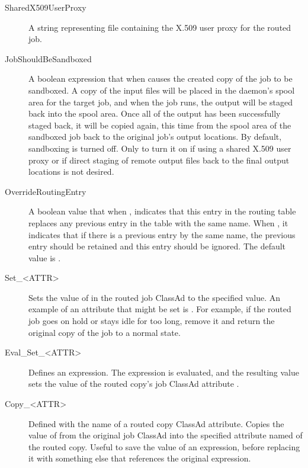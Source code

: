 \begin{description}
\item[SharedX509UserProxy]
A string representing file containing the X.509 user proxy for the routed job.

\item[JobShouldBeSandboxed] A boolean expression
that when  causes the created copy of the job to be sandboxed.
A copy of the input files will be placed in the
 daemon's spool area for the target job,
and when the job runs,
the output will be staged back into the spool area.
Once all of the output has been successfully staged back,
it will be copied again,
this time from the spool area of the sandboxed job back to the
original job's output locations.
By default, sandboxing is turned off.
Only to turn it on if using a shared X.509
user proxy or if direct staging of remote output files
back to the final output locations is not desired.

\item[OverrideRoutingEntry] A boolean value that when ,
indicates that this entry
in the routing table replaces any previous entry in the table
with the same name.
When , it indicates that if there is a
previous entry by the same name, the previous entry should be retained
and this entry should be ignored.
The default value is .

\item[Set\_<ATTR>] Sets the value of  in the routed
job ClassAd to the specified value.  An example of
an attribute that might be set is .
For example, if the routed job goes on hold or stays idle for too long,
remove it and return the original copy of the job to a normal state.

\item[Eval\_Set\_<ATTR>] Defines an expression.
The expression is evaluated, and the resulting value
sets the value of the routed copy's job ClassAd attribute .

\item[Copy\_<ATTR>] Defined with the name of a routed copy ClassAd
attribute. Copies the value of  from the
original job ClassAd into the specified attribute named of the routed copy.
Useful to save the value of an
expression, before replacing it with something else that references the
original expression.


\end{description}
